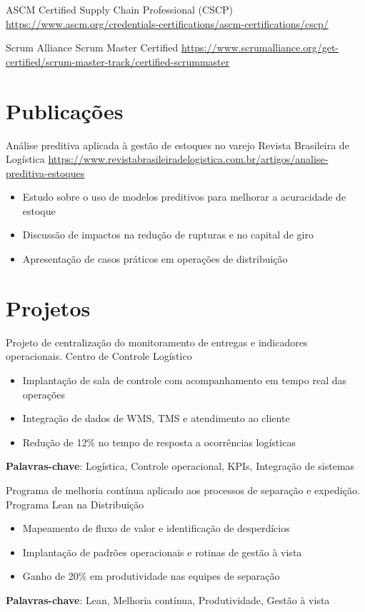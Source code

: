 \documentclass[a4paper, serif, 10pt]{moderncv}
\begin{document}
        {ASCM}
        {Certified Supply Chain Professional (CSCP)}
        {\url{https://www.ascm.org/credentials-certifications/ascm-certifications/cscp/}}
        {}
        {}

        {Scrum Alliance}
        {Scrum Master Certified}
        {\url{https://www.scrumalliance.org/get-certified/scrum-master-track/certified-scrummaster}}
        {}
        {}
\section{Publicações}

        {Análise preditiva aplicada à gestão de estoques no varejo}
        {Revista Brasileira de Logística}
        {\url{https://www.revistabrasileiradelogistica.com.br/artigos/analise-preditiva-estoques}}
        {}
        {\begin{itemize}
\item Estudo sobre o uso de modelos preditivos para melhorar a acuracidade de estoque
\item Discussão de impactos na redução de rupturas e no capital de giro
\item Apresentação de casos práticos em operações de distribuição
\end{itemize}}
\section{Projetos}

        {Projeto de centralização do monitoramento de entregas e indicadores operacionais.}
        {Centro de Controle Logístico}
        {}
        {}
        {\begin{itemize}
\item Implantação de sala de controle com acompanhamento em tempo real das operações
\item Integração de dados de WMS, TMS e atendimento ao cliente
\item Redução de 12\% no tempo de resposta a ocorrências logísticas
\end{itemize}
\textbf{Palavras-chave}: Logística, Controle operacional, KPIs, Integração de sistemas}

        {Programa de melhoria contínua aplicado aos processos de separação e expedição.}
        {Programa Lean na Distribuição}
        {}
        {}
        {\begin{itemize}
\item Mapeamento de fluxo de valor e identificação de desperdícios
\item Implantação de padrões operacionais e rotinas de gestão à vista
\item Ganho de 20\% em produtividade nas equipes de separação
\end{itemize}
\textbf{Palavras-chave}: Lean, Melhoria contínua, Produtividade, Gestão à vista}
\end{document}
